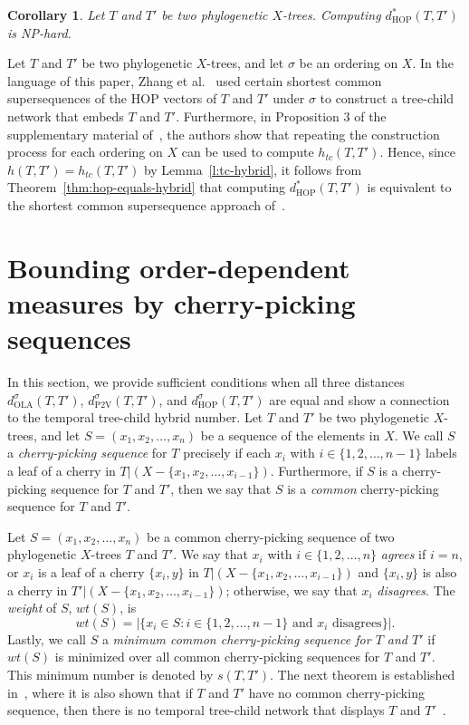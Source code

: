 \documentclass{article}
\newtheorem{cor}{Corollary}
\newcommand{\HOP}{\mathrm{HOP}}
\newcommand{\OLA}{\mathrm{OLA}}
\newcommand{\PV}{\mathrm{P2V}}
\begin{document}
\begin{cor} 
Let $T$ and $T'$ be two phylogenetic $X$-trees. Computing $d^*_\HOP(T,T')$ is {\em NP}-hard.
\end{cor}

Let $T$ and $T'$ be two phylogenetic $X$-trees, and let $\sigma$ be an ordering on $X$. In the language of this paper, Zhang et al.~\cite{zhang2023fast} used certain shortest common supersequences of the HOP vectors of $T$ and $T'$ under $\sigma$ to construct a tree-child network that embeds $T$ and $T'$. Furthermore, in Proposition 3 of the supplementary material of~\cite{zhang2023fast}, the authors show that repeating the construction process for each ordering on $X$ can be used to compute $h_{tc}(T,T')$. Hence, since $h(T,T')=h_{tc}(T,T')$ by Lemma~\ref{l:tc-hybrid}, it follows from Theorem~\ref{thm:hop-equals-hybrid} that computing $d_\HOP^*(T,T')$ is equivalent to the shortest common supersequence approach of~\cite{zhang2023fast}.

\section{Bounding order-dependent measures by cherry-picking sequences}
\label{results:cherry-picking}

In this section, we provide sufficient conditions when all three distances $d_\OLA^\sigma(T,T')$, $d_\PV^\sigma(T,T')$, and $d_\HOP^\sigma(T,T')$ are equal and show a connection to the temporal tree-child hybrid number. Let $T$ and $T'$ be two phylogenetic $X$-trees, and let $S=(x_1,x_2,\ldots,x_n)$ be a sequence of the elements in $X$. We call $S$ a {\em cherry-picking sequence} for $T$ precisely if each $x_i$ with $i\in\{1,2,\ldots,n-1\}$ labels a leaf of a cherry in $T|(X - \{x_1,x_2,\ldots,x_{i-1}\})$. Furthermore, if $S$ is a cherry-picking sequence for $T$ and $T'$, then we say that $S$ is a {\em common} cherry-picking sequence for $T$ and $T'$.

Let $S=(x_1,x_2,\ldots,x_n)$ be a common cherry-picking sequence of two  phylogenetic $X$-trees $T$ and $T'$. We say that $x_i$ with $i\in\{1,2,\ldots,n\}$ {\em agrees} if $i=n$, or $x_i$ is a leaf of a cherry $\{x_i,y\}$ in $T|(X- \{x_1,x_2,\ldots,x_{i-1}\})$ and $\{x_i,y\}$ is also a cherry in $T'|(X- \{x_1,x_2,\ldots,x_{i-1}\})$; otherwise, we say that $x_i$ {\em disagrees}. The {\em weight} of $S$, $wt(S)$, is
$$wt(S) = |\{x_i \in S:i\in\{1,2,\ldots,n-1\}\text{ and } x_i \text{ disagrees}\}|.$$
Lastly, we call $S$ a {\em minimum common cherry-picking sequence for $T$ and $T'$} if $wt(S)$ is minimized over all common cherry-picking sequences for $T$ and $T'$. This minimum number is denoted by $s(T,T')$. The next theorem is established in~\cite[Theorem 2]{humphries2013cherry}, where it is also shown that if $T$ and $T'$ have no common cherry-picking sequence, then there is no temporal tree-child network that displays $T$ and $T'$~\cite[Theorem 1]{humphries2013cherry}.
\end{document}

